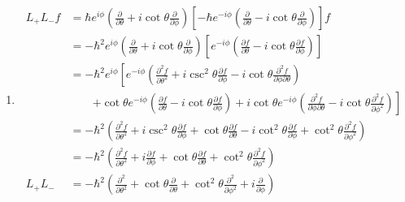 \documentclass{article}
\begin{document}
\begin{enumerate}
  \item

        \begin{align*}
          L_+ L_- f & = \hbar e^{i \phi} \left( \frac{\partial}{\partial \theta} + i \cot \theta \frac{\partial}{\partial \phi} \right) \left[ -\hbar e^{-i \phi} \left( \frac{\partial}{\partial \theta} - i \cot \theta \frac{\partial}{\partial \phi} \right) \right] f                                                  \\
                    & = -\hbar^2 e^{i \phi} \left( \frac{\partial}{\partial \theta} + i \cot \theta \frac{\partial}{\partial \phi} \right) \left[ e^{-i \phi} \left( \frac{\partial f}{\partial \theta} - i \cot \theta \frac{\partial f}{\partial \phi} \right) \right]                                                    \\
                    & = -\hbar^2 e^{i \phi} \left[ e^{-i \phi} \left( \frac{\partial^2 f}{\partial \theta^2} + i \csc^2 \theta \frac{\partial f}{\partial \phi} - i \cot \theta \frac{\partial^2 f}{\partial \phi \partial \theta} \right) \right.                                                                          \\
                    & \qquad \left. + \cot \theta e^{-i \phi} \left( \frac{\partial f}{\partial \theta} - i \cot \theta \frac{\partial f}{\partial \phi} \right) + i \cot \theta e^{-i \phi} \left( \frac{\partial^2 f}{\partial \phi \partial \theta} - i \cot \theta \frac{\partial^2 f}{\partial \phi^2} \right) \right] \\
                    & = -\hbar^2 \left( \frac{\partial^2 f}{\partial \theta^2} + i \csc^2 \theta \frac{\partial f}{\partial \phi} + \cot \theta \frac{\partial f}{\partial \theta} - i \cot^2 \theta \frac{\partial f}{\partial \phi} + \cot^2 \theta \frac{\partial^2 f}{\partial \phi^2} \right)                          \\
                    & = -\hbar^2 \left( \frac{\partial^2 f}{\partial \theta^2} + i \frac{\partial f}{\partial \phi} + \cot \theta \frac{\partial f}{\partial \theta} + \cot^2 \theta \frac{\partial^2 f}{\partial \phi^2} \right)                                                                                           \\
          L_+ L_-   & = -\hbar^2 \left( \frac{\partial^2}{\partial \theta^2} + \cot \theta \frac{\partial}{\partial \theta} + \cot^2 \theta \frac{\partial^2}{\partial \phi^2} + i \frac{\partial}{\partial \phi} \right)
        \end{align*}


\end{enumerate}
\end{document}
